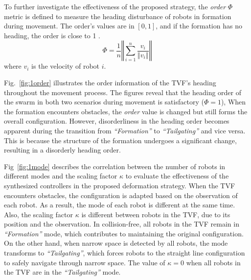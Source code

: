 To further investigate the effectiveness of the proposed strategy, the \textit{order} $\Phi$ metric is defined to measure the heading disturbance of robots in formation during movement. The order's values are in $\left[0,1\right]$, and if the formation has no heading, the order is close to 1 \cite{Vicsek1995}.
\begin{equation}
    \Phi=\dfrac{1}{n}\left\Vert\sum_{i=1}^n{\dfrac{v_i}{\left\Vert v_i\right\Vert}}\right\Vert
\end{equation}
where $v_i$ is the velocity of robot $i$.

Fig.~\ref{fig:1order} illustrates the order information of the TVF's heading throughout the movement process. The figures reveal that the heading order of the swarm in both two scenarios during movement is satisfactory ($\Phi = 1$), When the formation encounters obstacles, the \textit{order} value is changed but still forms the overall configuration. However, disorderliness in the heading order becomes apparent during the transition from \textit{``Formation''} to \textit{``Tailgating''} and vice versa. This is because the structure of the formation undergoes a significant change, resulting in a disorderly heading order.

Fig~\ref{fig:1mode} describes the correlation between the number of robots in different modes and the scaling factor $\kappa$ to evaluate the effectiveness of the synthesized controllers in the proposed deformation strategy. When the TVF encounters obstacles, the configuration is adapted based on the observation of each robot. As a result, the mode of each robot is different at the same time. Also, the scaling factor $\kappa$ is different between robots in the TVF, due to its position and the observation. In collision-free, all robots in the TVF remain in \textit{``Formation''} mode, which contributes to maintaining the original configuration. On the other hand, when narrow space is detected by all robots, the mode transforms to \textit{``Tailgating''}, which forces robots to the straight line configuration to safely navigate through narrow space. The value of $\kappa=0$ when all robots in the TVF are in the \textit{``Tailgating''} mode.

